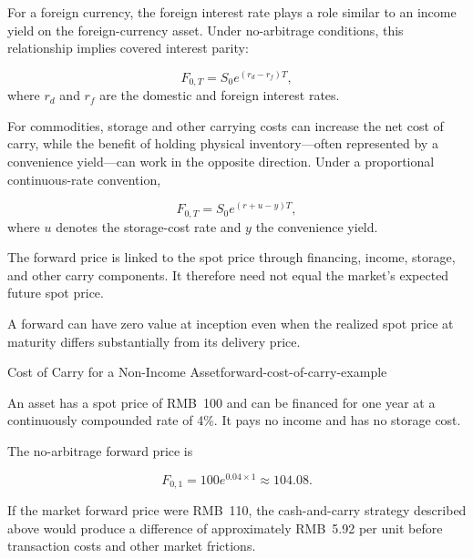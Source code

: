 For a foreign currency, the foreign interest rate plays a role similar to an income yield on the foreign-currency asset. Under no-arbitrage conditions, this relationship implies covered interest parity:

\begin{equation}
F_{0,T}=S_0 e^{(r_d-r_f)T},
\label{eq:ch17-fx-forward-relation}
\end{equation}
where $r_d$ and $r_f$ are the domestic and foreign interest rates.

For commodities, storage and other carrying costs can increase the net cost of carry, while the benefit of holding physical inventory---often represented by a convenience yield---can work in the opposite direction. Under a proportional continuous-rate convention,

\begin{equation}
F_{0,T}=S_0 e^{(r+u-y)T},
\label{eq:ch17-commodity-cost-of-carry}
\end{equation}
where $u$ denotes the storage-cost rate and $y$ the convenience yield.

\begin{tcolorbox}[
  enhanced,
  breakable,
  colback=white,
  colframe=FinanceBlue,
  boxrule=0.7pt,
  sharp corners,
  borderline west={2.2pt}{0pt}{FinanceBlue},
  title=\textbf{Financial Perspective: Forward Price Is Not a Forecast},
  coltitle=white,
  colbacktitle=FinanceBlue,
  fonttitle=\bfseries,
  before skip=1.2em,
  after skip=1.2em
]

The forward price is linked to the spot price through financing, income, storage, and other carry components. It therefore need not equal the market's expected future spot price.

A forward can have zero value at inception even when the realized spot price at maturity differs substantially from its delivery price.

\end{tcolorbox}

\begin{example}{Cost of Carry for a Non-Income Asset}{forward-cost-of-carry-example}

An asset has a spot price of RMB~100 and can be financed for one year at a continuously compounded rate of 4\%. It pays no income and has no storage cost.

The no-arbitrage forward price is

\[
F_{0,1}=100e^{0.04\times 1}\approx104.08.
\]

If the market forward price were RMB~110, the cash-and-carry strategy described above would produce a difference of approximately RMB~5.92 per unit before transaction costs and other market frictions.

\end{example}

